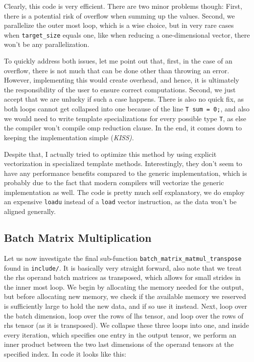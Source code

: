 \documentclass[sigconf]{acmart}
\begin{document}
Clearly, this code is very efficient. There are two minor problems though: First, there is a potential risk of overflow when summing up the values. Second, we parallelize the outer most loop, which is a wise choice, but in very rare cases when \texttt{target\_size} equals one, like when reducing a one-dimensional vector, there won't be any parallelization.

To quickly address both issues, let me point out that, first, in the case of an overflow, there is not much that can be done other than throwing an error. However, implementing this would create overhead, and hence, it is ultimately the responsibility of the user to ensure correct computations. Second, we just accept that we are unlucky if such a case happens. There is also no quick fix, as both loops cannot get collapsed into one because of the line \texttt{T sum = 0;}, and also we would need to write template specializations for every possible type \texttt{T}, as else the compiler won't compile omp reduction clause. In the end, it comes down to keeping the implementation simple (\em KISS\em ).

Despite that, I actually tried to optimize this method by using explicit vectorization in specialized template methods. Interestingly, they don't seem to have any performance benefits compared to the generic implementation, which is probably due to the fact that modern compilers will vectorize the generic implementation as well. The code is pretty much self explanatory, we do employ an expensive \texttt{loadu} instead of a \texttt{load} vector instruction, as the data won't be aligned generally.


\subsection{Batch Matrix Multiplication}
Let us now investigate the final sub-function \texttt{batch\_matrix\_matmul\_transpose} found in \texttt{include/}. It is basically very straight forward, also note that we treat the rhs operand batch matrices as transposed, which allows for small strides in the inner most loop. We begin by allocating the memory needed for the output, but before allocating new memory, we check if the available memory we reserved is sufficiently large to hold the new data, and if so use it instead. Next, loop over the batch dimension, loop over the rows of lhs tensor, and loop over the rows of rhs tensor (as it is transposed). We collapse these three loops into one, and inside every iteration, which specifies one entry in the output tensor, we perform an inner product between the two last dimensions of the operand tensors at the specified index. In code it looks like this:
\end{document}
